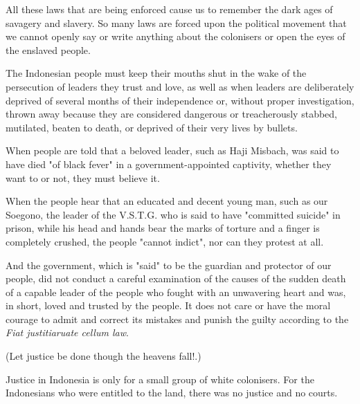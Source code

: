 All these laws that are being enforced cause us to remember the dark ages of 
savagery and slavery. So many laws are forced upon the political movement that 
we cannot openly say or write anything about the colonisers or open the eyes of the enslaved people.\nline

The Indonesian people must keep their mouths shut in the wake of the persecution 
of leaders they trust and love, as well as when leaders are deliberately deprived 
of several months of their independence or, without proper investigation, thrown 
away because they are considered dangerous or treacherously stabbed, mutilated, 
beaten to death, or deprived of their very lives by bullets.\nline

When people are told that a beloved leader, such as Haji Misbach, was said to 
have died "of black fever" in a government-appointed captivity, whether they want to or not, they must believe it.\nline

When the people hear that an educated and decent young man, such as our Soegono, the leader 
of the V.S.T.G. who is said to have "committed suicide" in prison, while his head and hands 
bear the marks of torture and a finger is completely crushed, the people "cannot indict", nor can they protest at all.\nline

And the government, which is "said" to be the guardian and protector of 
our people, did not conduct a careful examination of the causes of the 
sudden death of a capable leader of the people who fought with an unwavering 
heart and was, in short, loved and trusted by the people. It does not care or 
have the moral courage to admit and correct its mistakes and punish the guilty according to the \emph{Fiat justitiaruate cellum law}.\nline

(Let justice be done though the heavens fall!.)

Justice in Indonesia is only for a small group of white colonisers. For the Indonesians who were entitled to the land, there was no justice and no courts.\nline
